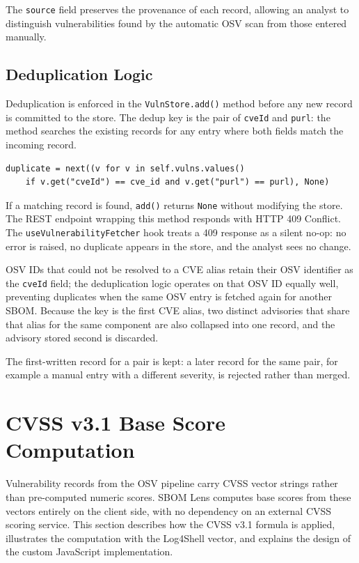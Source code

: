 The \texttt{source} field preserves the provenance of each record, allowing an analyst to distinguish vulnerabilities found by the automatic OSV scan from those entered manually.


\subsection{Deduplication Logic}
\label{sec:dedup-logic}

Deduplication is enforced in the \texttt{VulnStore.add()} method before any new record is committed to the store. The dedup key is the pair of \texttt{cveId} and \texttt{purl}: the method searches the existing records for any entry where both fields match the incoming record.

\begin{verbatim}
duplicate = next((v for v in self.vulns.values()
    if v.get("cveId") == cve_id and v.get("purl") == purl), None)
\end{verbatim}

If a matching record is found, \texttt{add()} returns \texttt{None} without modifying the store. The REST endpoint wrapping this method responds with HTTP 409 Conflict. The \texttt{useVulnerabilityFetcher} hook treats a 409 response as a silent no-op: no error is raised, no duplicate appears in the store, and the analyst sees no change.

OSV IDs that could not be resolved to a CVE alias retain their OSV identifier as the \texttt{cveId} field; the deduplication logic operates on that OSV ID equally well, preventing duplicates when the same OSV entry is fetched again for another SBOM. Because the key is the first CVE alias, two distinct advisories that share that alias for the same component are also collapsed into one record, and the advisory stored second is discarded.

The first-written record for a pair is kept: a later record for the same pair, for example a manual entry with a different severity, is rejected rather than merged.


\section{CVSS v3.1 Base Score Computation}
\label{sec:cvss-computation}

Vulnerability records from the OSV pipeline carry CVSS vector strings rather than pre-computed numeric scores. SBOM Lens computes base scores from these vectors entirely on the client side, with no dependency on an external CVSS scoring service. This section describes how the CVSS v3.1 formula is applied, illustrates the computation with the Log4Shell vector, and explains the design of the custom JavaScript implementation.


